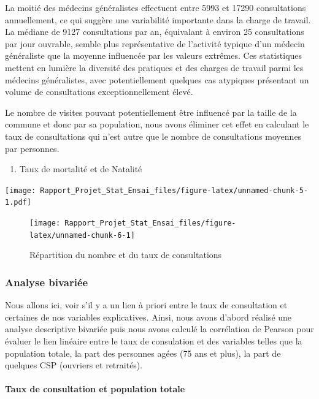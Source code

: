 \documentclass[
]{article}
\providecommand{\tightlist}{%
  \setlength{\itemsep}{0pt}\setlength{\parskip}{0pt}}
\begin{document}
La moitié des médecins généralistes effectuent entre 5993 et 17290
consultations annuellement, ce qui suggère une variabilité importante
dans la charge de travail. La médiane de 9127 consultations par an,
équivalant à environ 25 consultations par jour ouvrable, semble plus
représentative de l'activité typique d'un médecin généraliste que la
moyenne influencée par les valeurs extrêmes. Ces statistiques mettent en
lumière la diversité des pratiques et des charges de travail parmi les
médecins généralistes, avec potentiellement quelques cas atypiques
présentant un volume de consultations exceptionnellement élevé.

Le nombre de visites pouvant potentiellement être influencé par la
taille de la commune et donc par sa population, nous avons éliminer cet
effet en calculant le taux de consultations qui n'est autre que le
nombre de consultations moyennes par personnes.

\begin{enumerate}
\def\labelenumi{\arabic{enumi}.}
\setcounter{enumi}{1}
\tightlist
\item
  Taux de mortalité et de Natalité
\end{enumerate}

\texttt{[image: Rapport\_Projet\_Stat\_Ensai\_files/figure-latex/unnamed-chunk-5-1.pdf]}

\begin{figure}

{\centering \texttt{[image: Rapport\_Projet\_Stat\_Ensai\_files/figure-latex/unnamed-chunk-6-1]} 

}

\caption{Répartition du nombre et du taux de consultations}\label{fig:unnamed-chunk-6}
\end{figure}

\subsubsection{Analyse bivariée}\label{analyse-bivariuxe9e}

Nous allons ici, voir s'il y a un lien à priori entre le taux de
consultation et certaines de nos variables explicatives. Ainsi, nous
avons d'abord réalisé une analyse descriptive bivariée puis nous avons
calculé la corrélation de Pearson pour évaluer le lien linéaire entre le
taux de consulation et des variables telles que la population totale, la
part des personnes agées (75 ans et plus), la part de quelques CSP
(ouvriers et retraités).

\paragraph{Taux de consultation et population
totale}\label{taux-de-consultation-et-population-totale}
\end{document}

